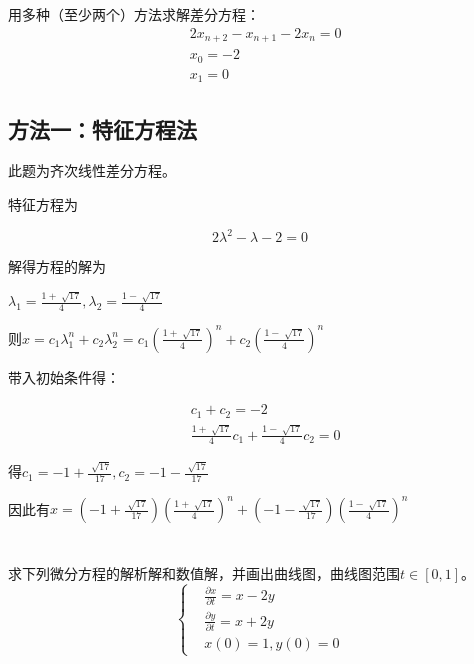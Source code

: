 \chapter{}

用多种（至少两个）方法求解差分方程：
\begin{equation*}
    \begin{split}
        &2x_{n+2} - x_{n+1} - 2x_n = 0\\
        &x_0 = -2\\
        &x_1 = 0
    \end{split}
\end{equation*}
\section{方法一：特征方程法}
此题为齐次线性差分方程。

特征方程为

\begin{equation}
    2\lambda^2-\lambda-2=0
\end{equation}

解得方程的解为

$\lambda_1 = \frac{1+\sqrt[]{17}}{4}, \lambda_2 = \frac{1-\sqrt[]{17}}{4} $

则$x=c_1\lambda_1^n + c_2\lambda_2^n = c_1(\frac{1+\sqrt[]{17}}{4})^n + c_2(\frac{1-\sqrt[]{17}}{4})^n$


带入初始条件得：

\begin{equation}
    \begin{aligned}
        &c_1+c_2=-2\\
        &\frac{1+\sqrt[]{17}}{4}c_1 + \frac{1-\sqrt[]{17}}{4}c_2 = 0
    \end{aligned}
\end{equation}

得$c_1=-1+\frac{\sqrt[]{17}}{17}, c_2=-1-\frac{\sqrt[]{17}}{17}$

因此有$x = (-1+\frac{\sqrt[]{17}}{17})(\frac{1+\sqrt[]{17}}{4})^n+(-1-\frac{\sqrt[]{17}}{17})( \frac{1-\sqrt[]{17}}{4} )^n$

\chapter{}


求下列微分方程的解析解和数值解，并画出曲线图，曲线图范围$t\in[0,1]$。
\begin{equation*}
    \left \{
        \begin{aligned}
            &\frac{\partial x}{\partial t} = x - 2y\\
            &\frac{\partial y}{\partial t} = x + 2y\\
            &x(0)=1, y(0) = 0
        \end{aligned}
    \right . 
\end{equation*}